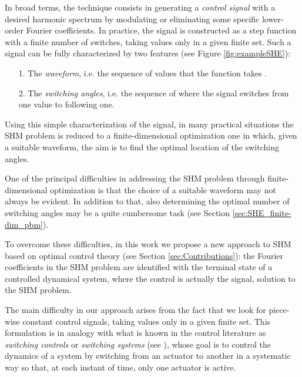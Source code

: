 \documentclass[twocolumn]{autart}    %
\begin{document}
In broad terms, the technique consists in generating a \textit{control signal} with a desired harmonic spectrum by modulating or eliminating some specific lower-order Fourier coefficients. In practice, the signal is constructed as a step function with a finite number of switches, taking values only in a given finite set. Such a signal can be fully characterized by two features (see Figure \ref{fig:exampleSHE}): 
\begin{itemize}
	\item[1.] The \textit{waveform}, i.e. the sequence of values that the function takes .
	\item[2.] The \textit{switching angles}, i.e. the sequence of  where the signal switches from one value to following one. 
\end{itemize}

Using this simple characterization of the signal, in many practical situations the SHM problem is reduced to a finite-dimensional optimization one in which, given a suitable waveform, the aim is to find the optimal location of the switching angles. 


One of the principal difficulties in addressing the SHM problem through finite-dimensional optimization is that the choice of a suitable waveform may not always be evident. In addition to that, also determining the optimal number of switching angles may be a quite cumbersome task (see Section \ref{sec:SHE_finite-dim_pbm}).   %
 
To overcome these difficulties, in this work we propose a new approach to SHM based on optimal control theory (see Section \ref{sec:Contributions}): the Fourier coefficients in the SHM problem are identified with the terminal state of a controlled dynamical system, where the control is actually the signal, solution to the SHM problem. 

The main difficulty in our approach arises from the fact that we look for piece-wise constant control signals, taking values only in a given finite set. This formulation is in analogy with what is known in the control literature as \textit{switching controls} or \textit{switching systems} (see \cite{liberzon2003switching,Zuazua2011, liu2014optimal}), whose goal is to control the dynamics of a system by switching from an actuator to another in a systematic way so that, at each instant of time, only one actuator is active.
\end{document}
